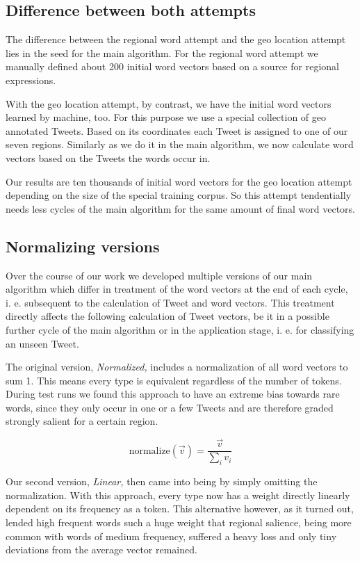 \documentclass[../Main.tex]{subfiles}
\begin{document}
\subsection{Difference between both attempts}
The difference between the regional word attempt and the geo location attempt lies in the seed for the main algorithm. For the regional word attempt we manually defined about 200 initial word vectors based on a source for regional expressions.

With the geo location attempt, by contrast, we have the initial word vectors learned by machine, too. For this purpose we use a special collection of geo annotated Tweets. Based on its coordinates each Tweet is assigned to one of our seven regions. Similarly as we do it in the main algorithm, we now calculate word vectors based on the Tweets the words occur in.

Our results are ten thousands of initial word vectors for the geo location attempt depending on the size of the special training corpus. So this attempt tendentially needs less cycles of the main algorithm for the same amount of final word vectors.

\subsection{Normalizing versions}
Over the course of our work we developed multiple versions of our main algorithm which differ in treatment of the word vectors at the end of each cycle, i. e. subsequent to the calculation of Tweet and word vectors. This treatment directly affects the following calculation of Tweet vectors, be it in a possible further cycle of the main algorithm or in the application stage, i. e. for classifying an unseen Tweet.

The original version, \textit{Normalized,} includes a normalization of all word vectors to sum 1. This means every type is equivalent regardless of the number of tokens. During test runs we found this approach to have an extreme bias towards rare words, since they only occur in one or a few Tweets and are therefore graded strongly salient for a certain region.

$$\text{normalize}(\vec v) = \frac{\vec v}{\sum_i v_i}$$

Our second version, \textit{Linear,} then came into being by simply omitting the normalization. With this approach, every type now has a weight directly linearly dependent on its frequency as a token. This alternative however, as it turned out, lended high frequent words such a huge weight that regional salience, being more common with words of medium frequency, suffered a heavy loss and only tiny deviations from the average vector remained.
\end{document}
